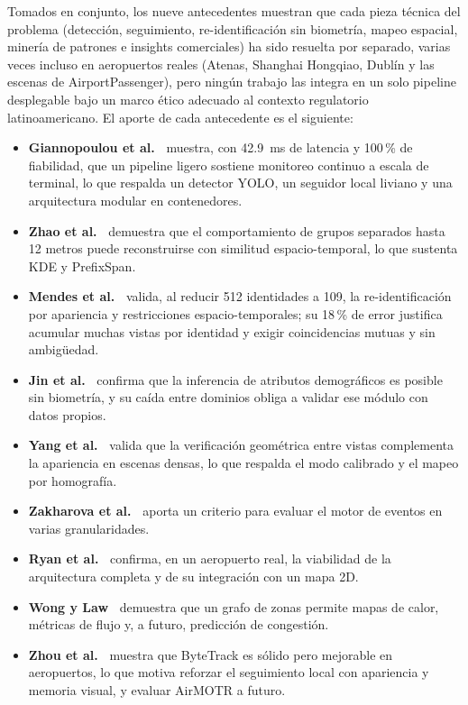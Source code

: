 \documentclass[12pt,letterpaper]{article}
\begin{document}
Tomados en conjunto, los nueve antecedentes muestran que cada pieza
técnica del problema (detección, seguimiento, re-identificación sin
biometría, mapeo espacial, minería de patrones e insights comerciales) ha
sido resuelta por separado, varias veces incluso en aeropuertos reales
(Atenas, Shanghai Hongqiao, Dublín y las escenas de AirportPassenger),
pero ningún trabajo las integra en un solo pipeline desplegable bajo un
marco ético adecuado al contexto regulatorio latinoamericano. El aporte
de cada antecedente es el siguiente:

\begin{itemize}
    \item \textbf{Giannopoulou et al.~\cite{giannopoulou2026}} muestra,
    con 42.9~ms de latencia y 100\,\% de fiabilidad, que un pipeline
    ligero sostiene monitoreo continuo a escala de terminal, lo que
    respalda un detector YOLO, un seguidor local liviano y una
    arquitectura modular en contenedores.

    \item \textbf{Zhao et al.~\cite{zhao2023}} demuestra que el
    comportamiento de grupos separados hasta 12 metros puede
    reconstruirse con similitud espacio-temporal, lo que sustenta KDE y
    PrefixSpan.

    \item \textbf{Mendes et al.~\cite{mendes2023}} valida, al reducir 512
    identidades a 109, la re-identificación por apariencia y restricciones
    espacio-temporales; su 18\,\% de error justifica acumular muchas
    vistas por identidad y exigir coincidencias mutuas y sin ambigüedad.

    \item \textbf{Jin et al.~\cite{jin2024}} confirma que la inferencia
    de atributos demográficos es posible sin biometría, y su caída entre
    dominios obliga a validar ese módulo con datos propios.

    \item \textbf{Yang et al.~\cite{yang2023}} valida que la verificación
    geométrica entre vistas complementa la apariencia en escenas densas,
    lo que respalda el modo calibrado y el mapeo por homografía.

    \item \textbf{Zakharova et al.~\cite{zakharova2026}} aporta un
    criterio para evaluar el motor de eventos en varias granularidades.

    \item \textbf{Ryan et al.~\cite{ryan2023}} confirma, en un aeropuerto
    real, la viabilidad de la arquitectura completa y de su integración
    con un mapa 2D.

    \item \textbf{Wong y Law~\cite{wonglaw2023}} demuestra que un grafo de
    zonas permite mapas de calor, métricas de flujo y, a futuro,
    predicción de congestión.

    \item \textbf{Zhou et al.~\cite{zhou2026}} muestra que ByteTrack es
    sólido pero mejorable en aeropuertos, lo que motiva reforzar el
    seguimiento local con apariencia y memoria visual, y evaluar AirMOTR a
    futuro.
\end{itemize}
\end{document}

